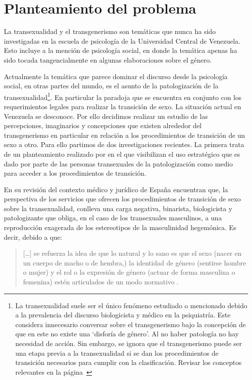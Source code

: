 \section{Planteamiento del problema}

La transexualidad y el transgenerismo son temáticas que nunca ha sido
investigadas en la escuela de psicología de la Universidad Central de Venezuela. Esto incluye a la mención de psicología
social, en donde la temática apenas ha sido tocada tangencialmente en algunas
elaboraciones sobre el género.

Actualmente la temática que parece dominar el discurso desde la psicología
social, en otras partes del mundo, es el asunto de la patologización de la
transexualidad\footnote{La transexualidad suele ser el único fenómeno estudiado
o mencionado debido a la prevalencia del discurso biologicista y médico en la
psiquiatría. Este considera innecesario conversar sobre el transgenerismo bajo
la concepción de que en este no existe una ‘disforía de género’. Al no haber
patología no hay necesidad de acción. Sin embargo, se ignora que el
transgenerismo puede ser una etapa previa a la transexualidad si se dan los
procedimientos de transición necesarios para cumplir con la clasificación.
Revisar los conceptos relevantes en la página~\pageref{diferencia}}. En
particular la paradoja que se encuentra en conjunto con los requerimientos
legales para realizar la transición de sexo. La situación actual en Venezuela se
desconoce. Por ello decidimos realizar un estudio de las percepciones,
imaginarios y concepciones que existen alrededor del transgenerismo en
particular en relación a los procedimientos de transición de un sexo a otro.
Para ello partimos de dos investigaciones recientes. La primera trata de un
planteamiento realizado por \textcite{Coll-Planas2015} en el que visibilizan el
uso estratégico que es dado por parte de las personas transexuales de la
patologización como medio para acceder a los procedimientos de transición.

En su revisión del contexto médico y jurídico de España encuentran que, la
perspectiva de los servicios que ofrecen los procedimientos de transición de
sexo sobre la transexualidad, conlleva una carga negativa, binarista,
biologicista y patologizante que obliga, en el caso de los transexuales
masculinos, a una reproducción exagerada de los estereotipos de la masculinidad
hegemónica. Es decir, debido a que:

\begin{quote}
[…] se refuerza la idea de que lo natural y lo sano es que el sexo (nacer en un
cuerpo de macho o de hembra,) la identidad de género (sentirse hombre o
mujer) y el rol o la expresión de género (actuar de forma masculina o
femenina) estén articulados de un modo normativo \parencite[][p.
426]{Coll-Planas2015}.
\end{quote}

